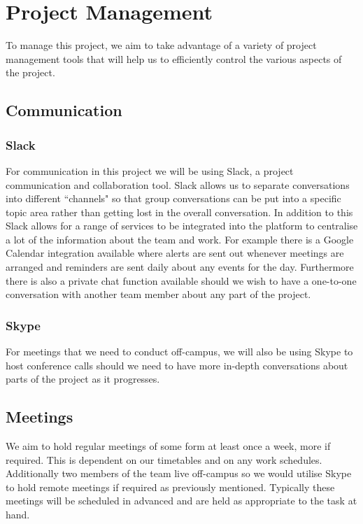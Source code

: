 \documentclass{article}
\begin{document}
\section{Project Management} \label{projectmanagementref}
To manage this project, we aim to take advantage of a variety of project management tools that will help us to efficiently control the various aspects of the project. 
\subsection{Communication}
\subsubsection{Slack}
For communication in this project we will be using Slack, a project communication and collaboration tool. Slack allows us to separate conversations into different ``channels" so that group conversations can be put into a specific topic area rather than getting lost in the overall conversation. In addition to this Slack allows for a range of services to be integrated into the platform to centralise a lot of the information about the team and work. For example there is a Google Calendar integration available where alerts are sent out whenever meetings are arranged and reminders are sent daily about any events for the day. Furthermore there is also a private chat function available should we wish to have a one-to-one conversation with another team member about any part of the project.
\subsubsection{Skype}
For meetings that we need to conduct off-campus, we will also be using Skype to host conference calls should we need to have more in-depth conversations about parts of the project as it progresses.
\subsection{Meetings}
We aim to hold regular meetings of some form at least once a week, more if required. This is dependent on our timetables and on any work schedules. Additionally two members of the team live off-campus so we would utilise Skype to hold remote meetings if required as previously mentioned. Typically these meetings will be scheduled in advanced and are held as appropriate to the task at hand.
\end{document}
